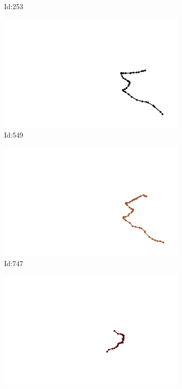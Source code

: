 \documentclass[12pt,twoside]{report}
\begin{document}
\begin{figure}
\begin{subfigure}[b]{0.20\textwidth}
\caption{Id:253}
\end{subfigure}
\begin{subfigure}[b]{0.20\textwidth}
\centering
\includegraphics[width=\textwidth]{../../trajectories/549.png}
\caption{Id:549}
\end{subfigure}
\begin{subfigure}[b]{0.20\textwidth}
\centering
\includegraphics[width=\textwidth]{../../trajectories/747.png}
\caption{Id:747}
\end{subfigure}
\begin{subfigure}[b]{0.20\textwidth}
\centering
\includegraphics[width=\textwidth]{../../trajectories/750.png}

\end{subfigure}
\end{figure}
\end{document}
